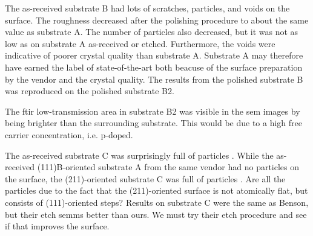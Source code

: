 
The as-received substrate B had lots of scratches, particles, and voids on the surface. The roughness decreased after the polishing procedure to about the same value as substrate A. The number of particles also decreased, but it was not as low as on substrate A as-received or etched. Furthermore, the voids were indicative of poorer crystal quality than substrate A. Substrate A may therefore have earned the label of state-of-the-art both beacuse of the surface preparation by the vendor and the crystal quality. The results from the polished substrate B was reproduced on the polished substrate B2.

The \ac{ftir} low-transmission area in substrate B2 was visible in the \ac{sem} images by being brighter than the surrounding substrate. This would be due to a high free carrier concentration, i.e. p-doped.

The as-received substrate C was surprisingly full of particles . While the as-received (111)B-oriented substrate A from the same vendor had no particles on the surface, the (211)-oriented substrate C was full of particles . Are all the particles due to the fact that the (211)-oriented surface is not atomically flat, but consists of (111)-oriented steps?  Results on substrate C were the same as Benson, but their etch semms better than ours. We must try their etch procedure and see if that improves the surface.



